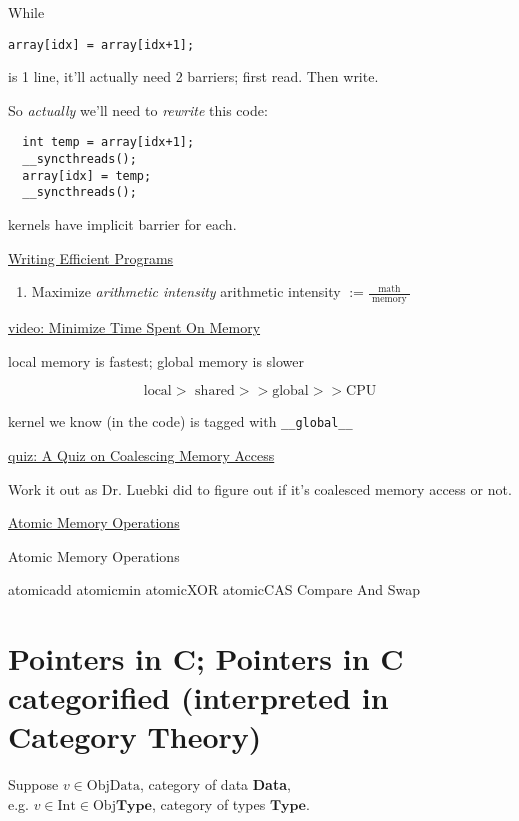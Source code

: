 \documentclass[10pt]{amsart}
\begin{document}
\begin{multicols*}{2}
While
\begin{lstlisting}
array[idx] = array[idx+1];
  \end{lstlisting}
is 1 line, it'll actually need 2 barriers; first read.  Then write.

So \emph{actually} we'll need to \emph{rewrite} this code:
\begin{lstlisting}
  int temp = array[idx+1];
  __syncthreads();
  array[idx] = temp;
  __syncthreads();
  \end{lstlisting}

kernels have implicit barrier for each.  

\href{https://classroom.udacity.com/courses/cs344/lessons/77202674/concepts/774332060923}{Writing Efficient Programs}

\begin{enumerate}
\item Maximize \emph{arithmetic intensity}
  arithmetic intensity $:= \frac{ \text{ math } }{ \text{ memory }}$
  \end{enumerate}

\href{https://classroom.udacity.com/courses/cs344/lessons/77202674/concepts/774332070923}{video: Minimize Time Spent On Memory}

local memory is fastest; global memory is slower

\[
\text{local} > \text{ shared} >> \text{global} >> \text{CPU}
\]

kernel we know (in the code) is tagged with \verb|__global__|

\href{https://classroom.udacity.com/courses/cs344/lessons/77202674/concepts/814086830923}{quiz: A Quiz on Coalescing Memory Access}

Work it out as Dr. Luebki did to figure out if it's coalesced memory access or not.  


\href{https://classroom.udacity.com/courses/cs344/lessons/77202674/concepts/774332150923}{Atomic Memory Operations}

Atomic Memory Operations

atomicadd atomicmin atomicXOR atomicCAS Compare And Swap



\section{Pointers in C; Pointers in C categorified (interpreted in Category Theory)}

Suppose $v\in \text{ObjData}$, category of data \textbf{Data}, \\
\phantom{ Suppose} e.g. $v\in \text{Int} \in \text{Obj}\mathbf{\text{Type}}$, category of types $\mathbf{\text{Type}}$.


\end{multicols*}
\end{document}
